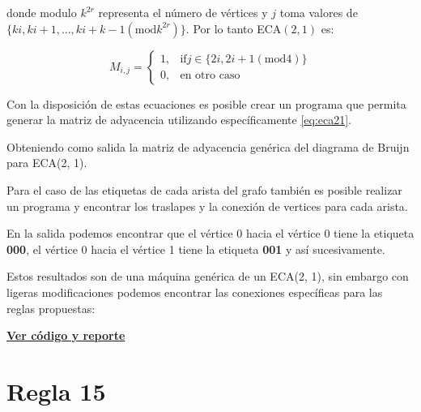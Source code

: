 donde modulo $k^{2r}$ representa el número de vértices y $j$ toma valores de $\{ki, ki+1,...,ki+k-1 (\text{mod} k^{2r})\}$. Por lo tanto ECA$(2, 1)$ es:

\begin{center}
	\begin{equation}
	M_{i,j} = 
	\begin{cases}
	1, & \text{if} j \in \{2i, 2i+1 (\text{mod} 4)\}\\
	0, & \text{en otro caso}
	\label{eq:eca21}
	\end{cases}
	\end{equation}
\end{center}

Con la disposición de estas ecuaciones es posible crear un programa que permita generar la matriz de adyacencia utilizando específicamente \ref{eq:eca21}.



Obteniendo como salida la matriz de adyacencia genérica del diagrama de Bruijn para ECA(2, 1).


Para el caso de las etiquetas de cada arista del grafo también es posible realizar un programa y encontrar los traslapes y la conexión de vertices para cada arista.


En la salida podemos encontrar que el vértice 0 hacia el vértice 0 tiene la etiqueta \textbf{000}, el vértice 0 hacia el vértice 1 tiene la etiqueta \textbf{001} y así sucesivamente.

\newpage
Estos resultados son de una máquina genérica de un ECA(2, 1), sin embargo con ligeras modificaciones podemos encontrar las conexiones específicas para las reglas propuestas:

 \hyperlink{https://github.com/QApolo/CS/tree/master/02_Bruijn}{\textbf{Ver código y reporte}}
\newpage
\section{Regla 15}


